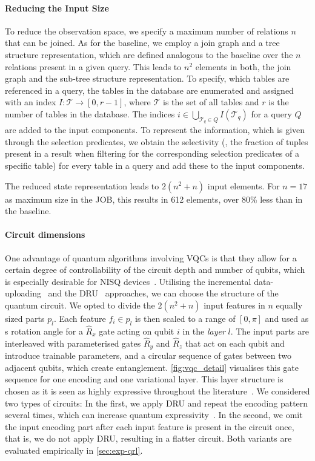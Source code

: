 \documentclass[10pt, conference]{IEEEtran}
\begin{document}
\paragraph{Reducing the Input Size}
\label{sec:mod-reduced}
To reduce the observation space, we specify a maximum number of relations $n$ that can be joined.
As for the baseline, we employ a join graph and a tree structure representation, which are defined analogous to the baseline over the $n$ relations present in a given query. This leads to $n^2$ elements in both, the join graph and the sub-tree structure representation.
To specify, which tables are referenced in a query, the tables in the database are enumerated and assigned with an index $I: \mathcal{T} \rightarrow [0, r-1]$, where $\mathcal{T}$ is the set of all tables and $r$ is the number of tables in the database.
The indices $i \in \bigcup_{\mathcal{T}_q \in Q} I(\mathcal{T}_q)$ for a query $Q$ are added to the input components.
To represent the information, which is given through the selection predicates, we obtain the selectivity (\ie, the fraction of tuples present in a result when filtering for the corresponding selection predicates of a specific table) for every table in a query and add these to the input components.

The reduced state representation leads to $2 (n^2 + n)$ input 
elements. For $n=17$ as maximum size in the JOB, 
this results in 612 elements, over 80\% less than
in the baseline.

\paragraph{Circuit dimensions}
\label{subsec:dimensions}
One advantage of quantum algorithms involving VQCs is that they allow for a certain degree of controllability of the circuit depth and number of qubits, which is especially desirable for NISQ devices~\cite{preskill18}.
Utilising the incremental data-uploading~\cite{periyasamy22} and the DRU~\cite{perez20} approaches, we can choose the structure of the quantum circuit.
We opted to divide the $2 (n^2 + n)$ input features in $n$ equally sized parts $p_l$.
Each feature $f_i \in p_l$ is then scaled to a range of $[0, \pi]$ and used as s rotation angle for a $\hat{R}_x$ gate acting on qubit $i$ in the \emph{layer} $l$.
The input parts are interleaved with parameterised gates $\hat{R}_y$ and $\hat{R}_z$ that act on each qubit and introduce trainable parameters, and a circular sequence of \CZgate gates between two adjacent qubits, which create entanglement.
\autoref{fig:vqc_detail} visualises this gate sequence for one encoding and one variational layer.
This layer structure is chosen as it is seen as highly expressive throughout the literature~\cite{kandala17, skolik22}.
We considered two types of circuits:
In the first, we apply DRU and repeat the encoding pattern several times, which can increase quantum expressivity~\cite{perez20}.
In the second, we omit the input encoding part after each input feature is present in the circuit once, that is, we do not apply DRU, resulting in a flatter circuit.
Both variants are evaluated empirically in \autoref{sec:exp-qrl}.
\end{document}
